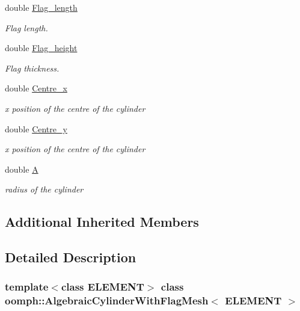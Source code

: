 \begin{DoxyCompactItemize}
double \hyperlink{classoomph_1_1AlgebraicCylinderWithFlagMesh_a822ed90585320576084667f88c236396}{Flag\+\_\+length}
\begin{DoxyCompactList}\small\item\em Flag length. \end{DoxyCompactList}\item 
double \hyperlink{classoomph_1_1AlgebraicCylinderWithFlagMesh_a76a19a39dd500d5a48c10baae59797e0}{Flag\+\_\+height}
\begin{DoxyCompactList}\small\item\em Flag thickness. \end{DoxyCompactList}\item 
double \hyperlink{classoomph_1_1AlgebraicCylinderWithFlagMesh_a3290ac9103e43f4a4a997fe4692b6506}{Centre\+\_\+x}
\begin{DoxyCompactList}\small\item\em x position of the centre of the cylinder \end{DoxyCompactList}\item 
double \hyperlink{classoomph_1_1AlgebraicCylinderWithFlagMesh_a6b4575a9c3818e04bdb00d4150d49290}{Centre\+\_\+y}
\begin{DoxyCompactList}\small\item\em x position of the centre of the cylinder \end{DoxyCompactList}\item 
double \hyperlink{classoomph_1_1AlgebraicCylinderWithFlagMesh_aabc6cdfe508f04a4b1c92f2c2f1639c4}{A}
\begin{DoxyCompactList}\small\item\em radius of the cylinder \end{DoxyCompactList}\end{DoxyCompactItemize}
\subsection*{Additional Inherited Members}


\subsection{Detailed Description}
\subsubsection*{template$<$class E\+L\+E\+M\+E\+NT$>$\newline
class oomph\+::\+Algebraic\+Cylinder\+With\+Flag\+Mesh$<$ E\+L\+E\+M\+E\+N\+T $>$}

